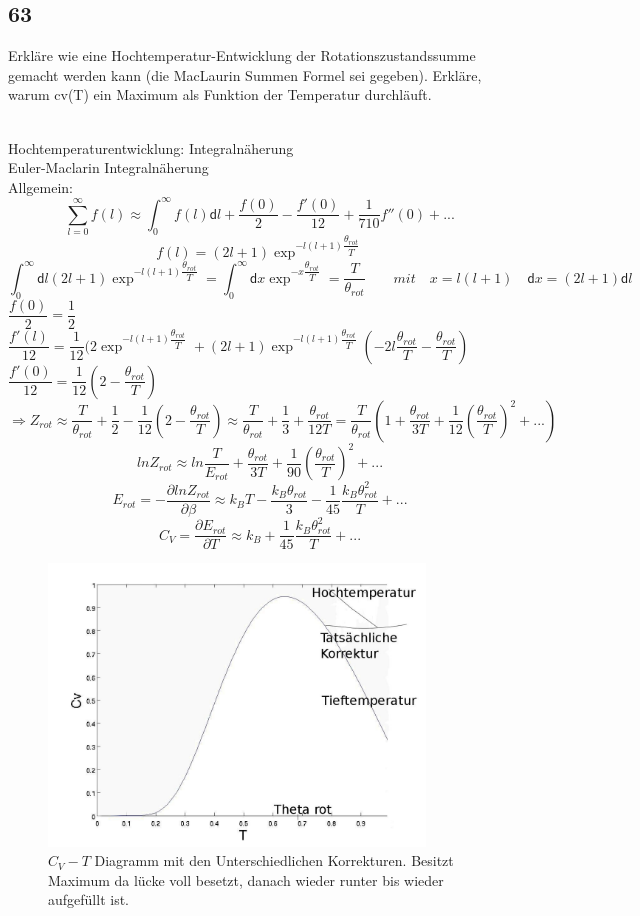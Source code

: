 \documentclass[12pt,a4paper]{report}
\newcommand{\dif}{\mathsf{d}}
\newenvironment{myfrag}{\begin{it}}{\end{it}\vspace{3mm}\par}
\numberwithin{equation}{section}
\begin{document}
\subsection{63}
\begin{myfrag}
Erkläre wie eine Hochtemperatur-Entwicklung der Rotationszustandssumme
gemacht werden kann (die MacLaurin Summen Formel sei gegeben). Erkläre,
warum cv(T) ein Maximum als Funktion der Temperatur durchläuft.
\end{myfrag} \quad \\
Hochtemperaturentwicklung: Integralnäherung \\[2ex]
Euler-Maclarin Integralnäherung \\[1ex]
Allgemein: $$ \sum \limits _{l=0}^\infty f(l) \approx \int _0 ^\infty f(l) \dif l + \dfrac{f(0)}{2} - \dfrac{f'(0)}{12}+\dfrac{1}{710} f''(0)+ ...$$
 $$ f(l) = ( 2l+1) \exp ^{-l(l+1)\dfrac{\theta _{rot}}{T}}$$
 $$ \int _0^\infty \dif l (2l+1)\exp ^{-l(l+1)\dfrac{\theta _{rot}}{T}} = \int _0 ^\infty \dif x \exp ^{-x\dfrac{\theta _{rot}}{T}} = \dfrac{T}{\theta_{rot}} \qquad mit \quad x = l(l+1) \quad \dif x = (2l+1) \dif l$$
 $\dfrac{f(0)}{2}=\dfrac{1}{2}$ \\[1.5ex]
 
 $\dfrac{f'(l)}{12}= \dfrac{1}{12} ( 2 \exp ^{-l(l+1)\dfrac{\theta _{rot}}{T}} + (2l+1) \exp ^{-l(l+1)\dfrac{\theta _{rot}}{T}}\left( -2l\dfrac{\theta_{rot}}{T}-\dfrac{\theta_{rot}}{T} \right)$ \\[1.5ex]
 $\dfrac{f'(0)}{12} = \dfrac{1}{12} \left( 2 - \dfrac{\theta_{rot}}{T} \right)$
 $$\Rightarrow Z_{rot} \approx \dfrac{T}{\theta_{rot}} + \dfrac{1}{2} - \dfrac{1}{12}\left(2-\dfrac{\theta_{rot}}{T} \right) \approx \dfrac{T}{\theta_{rot}} + \dfrac{1}{3} + \dfrac{\theta_{rot}}{12T} = \dfrac{T}{\theta_{rot}} \left( 1+ \dfrac{\theta_{rot}}{3T} + \dfrac{1}{12}\left(\dfrac{\theta_{rot}}{T} \right) ^2 + ... \right)$$
$$ ln Z _{rot} \approx ln \dfrac{T}{E_{rot}} + \dfrac{\theta_{rot}}{3T} + \dfrac{1}{90} \left( \dfrac{\theta _{rot}}{T}\right)^2 + ...$$
$$ E_{rot} = - \dfrac{\partial lnZ_{rot}}{\partial \beta } \approx k_B T - \dfrac{k_B \theta_{rot}}{3} - \dfrac{1}{45} \dfrac{k_B \theta_{rot}^2}{T}+...$$
$$ C_V = \dfrac{\partial E_{rot}}{\partial T} \approx k_B + \dfrac{1}{45} \dfrac{k_B \theta_{rot}^2}{T}+...$$
\begin{figure}[H]
\includegraphics[width= 10cm]{Bilder/Frage63.jpg} 
\caption{$C_V -T $ Diagramm mit den Unterschiedlichen Korrekturen. Besitzt Maximum da lücke voll besetzt, danach wieder runter bis wieder aufgefüllt ist.}

\end{figure}
\end{document}
